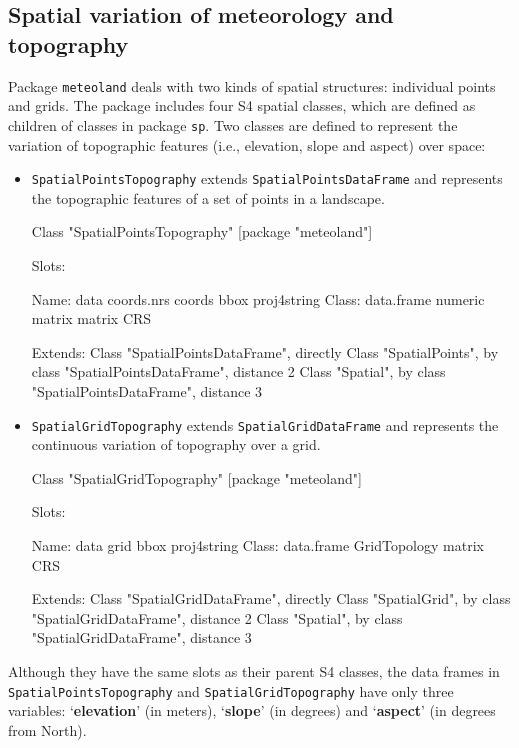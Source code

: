 \documentclass[11pt,a4paper]{article}
\begin{document}
\subsection{Spatial variation of meteorology and topography}
Package \texttt{meteoland} deals with two kinds of spatial structures: individual points and grids. The package includes four S4 spatial classes, which are defined as children of classes in package \texttt{sp}. Two classes are defined to represent the variation of topographic features (i.e., elevation, slope and aspect) over space:
\begin{itemize}
\item{\texttt{SpatialPointsTopography} extends \texttt{SpatialPointsDataFrame} and represents the topographic features of a set of points in a landscape.
\begin{Schunk}
\begin{Soutput}
Class "SpatialPointsTopography" [package "meteoland"]

Slots:
                                                                  
Name:         data  coords.nrs      coords        bbox proj4string
Class:  data.frame     numeric      matrix      matrix         CRS

Extends: 
Class "SpatialPointsDataFrame", directly
Class "SpatialPoints", by class "SpatialPointsDataFrame", distance 2
Class "Spatial", by class "SpatialPointsDataFrame", distance 3
\end{Soutput}
\end{Schunk}
}
\item{\texttt{SpatialGridTopography} extends \texttt{SpatialGridDataFrame} and represents the continuous variation of topography over a grid.
\begin{Schunk}
\begin{Soutput}
Class "SpatialGridTopography" [package "meteoland"]

Slots:
                                                          
Name:          data         grid         bbox  proj4string
Class:   data.frame GridTopology       matrix          CRS

Extends: 
Class "SpatialGridDataFrame", directly
Class "SpatialGrid", by class "SpatialGridDataFrame", distance 2
Class "Spatial", by class "SpatialGridDataFrame", distance 3
\end{Soutput}
\end{Schunk}
}
\end{itemize}
Although they have the same slots as their parent S4 classes, the data frames in \texttt{SpatialPointsTopography} and \texttt{SpatialGridTopography} have only three variables: `\textbf{elevation}' (in meters), `\textbf{slope}' (in degrees) and `\textbf{aspect}' (in degrees from North).
\end{document}
